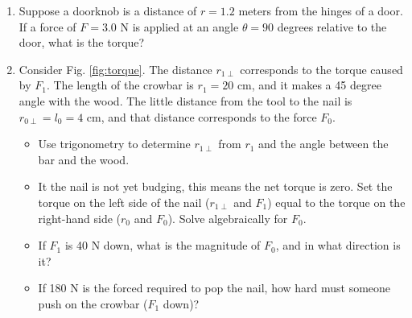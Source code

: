 \documentclass{article}
\begin{document}
\begin{enumerate}
\item Suppose a doorknob is a distance of $r = 1.2$ meters from the hinges of a door.  If a force of $F = 3.0$ N is applied at an angle $\theta = 90$ degrees relative to the door, what is the torque? \\ \vspace{1cm}
\item Consider Fig. \ref{fig:torque}.  The distance $r_{1\perp}$ corresponds to the torque caused by $F_1$.  The length of the crowbar is $r_1 = 20$ cm, and it makes a 45 degree angle with the wood.  The little distance from the tool to the nail is $r_{0\perp} = l_0 = 4$ cm, and that distance corresponds to the force $F_0$.
\begin{itemize}
\item Use trigonometry to determine $r_{1\perp}$ from $r_1$ and the angle between the bar and the wood.
\item It the nail is not yet budging, this means the net torque is zero.  Set the torque on the left side of the nail ($r_{1\perp}$ and $F_1$) equal to the torque on the right-hand side ($r_{0}$ and $F_0$).  Solve algebraically for $F_0$.
\item If $F_1$ is 40 N down, what is the magnitude of $F_0$, and in what direction is it?
\item If 180 N is the forced required to pop the nail, how hard must someone push on the crowbar ($F_1$ down)?
\end{itemize}
\end{enumerate}
\end{document}

